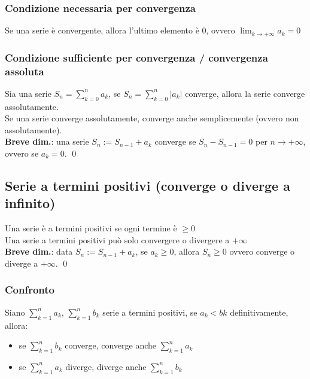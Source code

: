 \documentclass[a4paper]{article}
\begin{document}
\subsubsection*{Condizione necessaria per convergenza}
Se una serie è convergente, allora l'ultimo elemento è 0, ovvero \(\displaystyle \lim_{k \to +\infty} a_k = 0\)

\subsubsection*{Condizione sufficiente per convergenza / convergenza assoluta}
Sia una serie \(\displaystyle S_n = \sum_{k = 0}^{n} a_k\), se \(\displaystyle S_n = \sum_{k = 0}^{n} \left| a_k \right|\) converge, allora la serie converge assolutamente. \\
Se una serie converge assolutamente, converge anche semplicemente (ovvero non assolutamente). \\
\textbf{Breve dim.}: una serie \(S_n := S_{n-1} + a_k\) converge se \(S_n - S_{n-1} = 0\) per \(n \to +\infty\), ovvero se \(a_k = 0\). \qed

\subsection{Serie a termini positivi (converge o diverge a infinito)}
Una serie è a termini positivi se ogni termine è \(\geq 0\) \\ 
Una serie a termini positivi può solo convergere o divergere a \(+ \infty\) \\
\textbf{Breve dim.}: data \(S_n := S_{n-1} + a_k\), se \(a_k \geq 0\), allora \(S_n \geq 0\) ovvero converge o diverge a \(+\infty\). \qed

\subsubsection*{Confronto}
Siano \(\displaystyle \sum_{k = 1}^{n} a_k\), \(\displaystyle \sum_{k = 1}^{n} b_k\) serie a termini positivi, se \(a_k < bk\) definitivamente, allora:
\begin{itemize}
	\item se \( \sum_{k = 1}^{n} b_k\) converge, converge anche \(\sum_{k = 1}^{n} a_k\)
	\item se \(\sum_{k = 1}^{n} a_k\) diverge, diverge anche \(\sum_{k = 1}^{n} b_k\)
\end{itemize}
\end{document}
